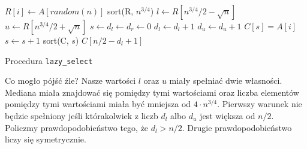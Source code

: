 \begin{algorithm}
  \DontPrintSemicolon
  
  
  
   {
     $R[i] \leftarrow A[random(n)]$\;
   }
   sort(R, $n^{3/4}$)\;
   $l \leftarrow R[n^{3/4}/2 - \sqrt{n}]$\;
   $u \leftarrow R[n^{3/4}/2 + \sqrt{n}]$\;
   $s \leftarrow d_l \leftarrow d_r \leftarrow 0$\;
   {
     {
      $d_l \leftarrow d_l + 1$
     }
     {
      $d_u \leftarrow d_u + 1$
     }
     \Else
     {
      $C[s] = A[i]$\;
      $s \leftarrow s + 1$\;
     }
   }
   {
   }
   sort(C, $s$)\;
   \Return $C[n/2 - d_l + 1]$\;
  \caption{Procedura \texttt{lazy\_select}}
  \label{lazy-select}
\end{algorithm}

Co mogło pójść źle?
Nasze wartości $l$ oraz $u$ miały spełniać dwie własności.
Mediana miała znajdować się pomiędzy tymi wartościami oraz liczba elementów pomiędzy tymi wartościami miała być mniejsza od $4 \cdot n^{3/4}$.
Pierwszy warunek nie będzie spełniony jeśli którakolwiek z liczb $d_l$ albo $d_u$ jest większa od $n/2$.
Policzmy prawdopodobieństwo tego, że $d_l > n/2$.
Drugie prawdopodobieństwo liczy się symetrycznie.

